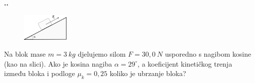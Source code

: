 

\noindent 
\textbf{
\thecjelina.\thezadatak.}
\begin{figure} %
    \centering
    \includegraphics[width=0.2\textwidth]{03_Dinamika_materijalne_tocke/kosina.png}
\end{figure}
Na blok mase $m = 3\ kg$ djelujemo silom $F = 30,0\ N$
usporedno s nagibom kosine (kao na slici). Ako je kosina
nagiba $\alpha = 29^\circ$, a koeficijent kineti\v{c}kog trenja između
bloka i podloge $\mu_k = 0,25$ koliko je ubrzanje bloka?



